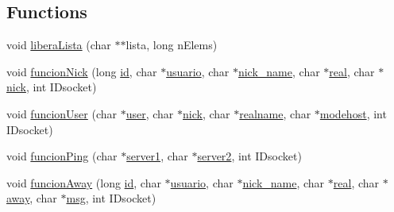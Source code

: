 \subsection*{Functions}
\begin{DoxyCompactItemize}
\item 
void \hyperlink{_g-2361-06-_p1-_functions_8h_a5fa63429b3483f20a469c23625c96820}{libera\+Lista} (char $\ast$$\ast$lista, long n\+Elems)
\item 
void \hyperlink{_g-2361-06-_p1-_functions_8h_ad060b5b909c563dc4d6d1737c9bfaaa9}{funcion\+Nick} (long \hyperlink{_g-2361-06-_p1-_server_8c_a7350fbd6ad10618f3b750b1f99ca5c3c}{id}, char $\ast$\hyperlink{_g-2361-06-_p1-_server_8c_a0147a5b81499984f9cb00379a8cb84af}{usuario}, char $\ast$\hyperlink{_g-2361-06-_p1-_server_8c_aabbf66718cda228b924a4a9441eadf62}{nick\+\_\+name}, char $\ast$\hyperlink{_g-2361-06-_p1-_server_8c_af832f551e1c343666c3d2a55834139a0}{real}, char $\ast$\hyperlink{_g-2361-06-_p1-_server_8c_a89f27568c92a418413e6b37b41f07e21}{nick}, int I\+Dsocket)
\item 
void \hyperlink{_g-2361-06-_p1-_functions_8h_a210d0586ca040ccaa2104d06e224c108}{funcion\+User} (char $\ast$\hyperlink{_g-2361-06-_p1-_server_8c_a14871705f45ccdc5bb9f4549efd8e119}{user}, char $\ast$\hyperlink{_g-2361-06-_p1-_server_8c_a89f27568c92a418413e6b37b41f07e21}{nick}, char $\ast$\hyperlink{_g-2361-06-_p1-_server_8c_a980ab011cd3d327b370c042833f1dc08}{realname}, char $\ast$\hyperlink{_g-2361-06-_p1-_server_8c_a4f28f55d19ac069eabc38c224c3a4225}{modehost}, int I\+Dsocket)
\item 
void \hyperlink{_g-2361-06-_p1-_functions_8h_a3280e4bc8a783afb907ef479e98b909e}{funcion\+Ping} (char $\ast$\hyperlink{_g-2361-06-_p1-_server_8c_a9045e9ee0087b60273244cd6c2f91a5f}{server1}, char $\ast$\hyperlink{_g-2361-06-_p1-_server_8c_a70dd311bef3d0b4160a7ce0706f8f4cc}{server2}, int I\+Dsocket)
\item 
void \hyperlink{_g-2361-06-_p1-_functions_8h_a92e862feef3db4374ed9b1b941edfae3}{funcion\+Away} (long \hyperlink{_g-2361-06-_p1-_server_8c_a7350fbd6ad10618f3b750b1f99ca5c3c}{id}, char $\ast$\hyperlink{_g-2361-06-_p1-_server_8c_a0147a5b81499984f9cb00379a8cb84af}{usuario}, char $\ast$\hyperlink{_g-2361-06-_p1-_server_8c_aabbf66718cda228b924a4a9441eadf62}{nick\+\_\+name}, char $\ast$\hyperlink{_g-2361-06-_p1-_server_8c_af832f551e1c343666c3d2a55834139a0}{real}, char $\ast$\hyperlink{_g-2361-06-_p1-_server_8c_adf86742e21384f58f8999d8317e6a370}{away}, char $\ast$\hyperlink{_g-2361-06-_p1-_server_8c_a32d2f5216cddb59c7cc8fb2806a7e727}{msg}, int I\+Dsocket)
$$
\end{DoxyCompactItemize}
